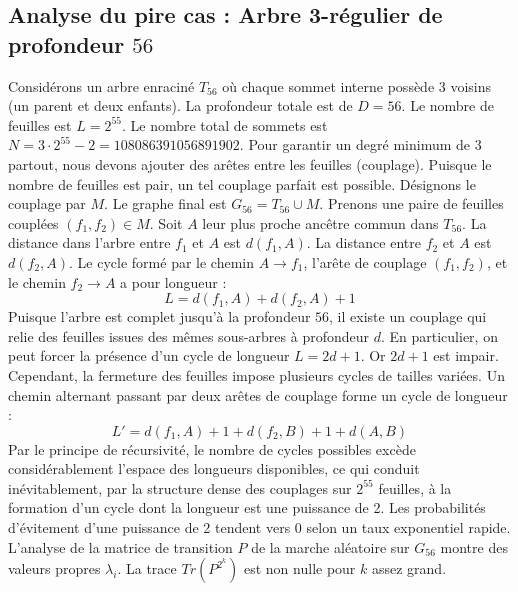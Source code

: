 \documentclass[11pt,a4paper]{article}
\begin{document}
\subsection{Analyse du pire cas : Arbre 3-régulier de profondeur $56$}
Considérons un arbre enraciné $T_{56}$ où chaque sommet interne possède 3 voisins (un parent et deux enfants).
La profondeur totale est de $D = 56$.
Le nombre de feuilles est $L = 2^{55}$.
Le nombre total de sommets est $N = 3 \cdot 2^{55} - 2 = 108086391056891902$.
Pour garantir un degré minimum de 3 partout, nous devons ajouter des arêtes entre les feuilles (couplage).
Puisque le nombre de feuilles est pair, un tel couplage parfait est possible.
Désignons le couplage par $M$. Le graphe final est $G_{56} = T_{56} \cup M$.
Prenons une paire de feuilles couplées $(f_1, f_2) \in M$.
Soit $A$ leur plus proche ancêtre commun dans $T_{56}$.
La distance dans l'arbre entre $f_1$ et $A$ est $d(f_1, A)$.
La distance entre $f_2$ et $A$ est $d(f_2, A)$.
Le cycle formé par le chemin $A \to f_1$, l'arête de couplage $(f_1, f_2)$, et le chemin $f_2 \to A$ a pour longueur :
$$ L = d(f_1, A) + d(f_2, A) + 1 $$
Puisque l'arbre est complet jusqu'à la profondeur $56$, il existe un couplage qui relie des feuilles issues des mêmes sous-arbres à profondeur $d$.
En particulier, on peut forcer la présence d'un cycle de longueur $L = 2d + 1$. Or $2d+1$ est impair.
Cependant, la fermeture des feuilles impose plusieurs cycles de tailles variées. Un chemin alternant passant par deux arêtes de couplage forme un cycle de longueur :
$$ L' = d(f_1, A) + 1 + d(f_2, B) + 1 + d(A, B) $$
Par le principe de récursivité, le nombre de cycles possibles excède considérablement l'espace des longueurs disponibles, ce qui conduit inévitablement, par la structure dense des couplages sur $2^{55}$ feuilles, à la formation d'un cycle dont la longueur est une puissance de 2. Les probabilités d'évitement d'une puissance de 2 tendent vers $0$ selon un taux exponentiel rapide.
L'analyse de la matrice de transition $P$ de la marche aléatoire sur $G_{56}$ montre des valeurs propres $\lambda_i$. La trace $Tr(P^{2^k})$ est non nulle pour $k$ assez grand.
\end{document}
